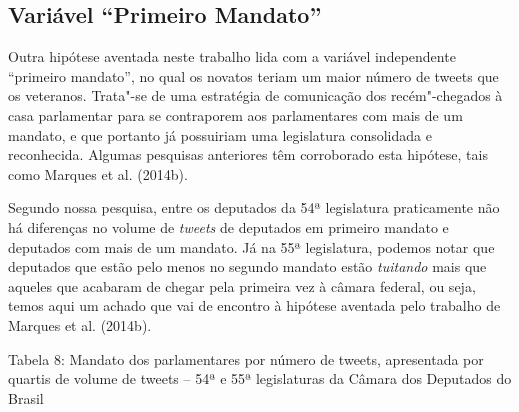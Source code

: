 
\subsection{Variável ``Primeiro Mandato''}

Outra hipótese aventada neste trabalho lida com a variável independente
``primeiro mandato'', no qual os novatos teriam um maior número de
tweets que os veteranos. Trata"-se de uma estratégia de comunicação dos
recém"-chegados à casa parlamentar para se contraporem aos parlamentares
com mais de um mandato, e que portanto já possuiriam uma legislatura
consolidada e reconhecida. Algumas pesquisas anteriores têm corroborado
esta hipótese, tais como Marques et al. (2014b).

Segundo nossa pesquisa, entre os deputados da 54ª legislatura
praticamente não há diferenças no volume de \emph{tweets} de deputados
em primeiro mandato e deputados com mais de um mandato. Já na 55ª
legislatura, podemos notar que deputados que estão pelo menos no segundo
mandato estão \emph{tuitando} mais que aqueles que acabaram de chegar
pela primeira vez à câmara federal, ou seja, temos aqui um achado que
vai de encontro à hipótese aventada pelo trabalho de Marques et al.
(2014b).

\begin{center}
Tabela 8: Mandato dos parlamentares por número de tweets,
apresentada por quartis de volume de tweets -- 54ª e 55ª legislaturas da
Câmara dos Deputados do Brasil
\end{center}

